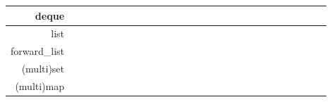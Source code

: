 \begin{frame}[fragile]
{\begin{tabular}{|r|lllll|llll|llllll|lllllllll|ll|}
        deque & \cellcolor{green} & \cellcolor{green} & \cellcolor{green} & \cellcolor{green} & \cellcolor{red} & \cellcolor{green} & \cellcolor{green} & \cellcolor{green} & \cellcolor{green} & \cellcolor{green} & \cellcolor{green} & \cellcolor{green} & \cellcolor{red} & \cellcolor{red} & \cellcolor{green} & \cellcolor{green} & \cellcolor{green} & \cellcolor{green} & \cellcolor{green} & \cellcolor{green} & \cellcolor{green} & \cellcolor{green} & \cellcolor{red} & \cellcolor{green} & \cellcolor{green} & \cellcolor{green} \\
        \hline
        list & \cellcolor{red} & \cellcolor{red} & \cellcolor{green} & \cellcolor{green} & \cellcolor{red} & \cellcolor{green} & \cellcolor{green} & \cellcolor{green} & \cellcolor{green} & \cellcolor{green} & \cellcolor{green} & \cellcolor{green} & \cellcolor{red} & \cellcolor{red} & \cellcolor{red} & \cellcolor{green} & \cellcolor{green} & \cellcolor{green} & \cellcolor{green} & \cellcolor{green} & \cellcolor{green} & \cellcolor{green} & \cellcolor{red} & \cellcolor{green} & \cellcolor{green} & \cellcolor{green} \\
        forward\_list & \cellcolor{red} & \cellcolor{red} & \cellcolor{green} & \cellcolor{red} & \cellcolor{red} & \cellcolor{green} & \cellcolor{green} & \cellcolor{red} & \cellcolor{red} & \cellcolor{green} & \cellcolor{red} & \cellcolor{green} & \cellcolor{red} & \cellcolor{red} & \cellcolor{red} & \cellcolor{green} & \cellcolor{yellow} & \cellcolor{yellow} & \cellcolor{yellow} & \cellcolor{red} & \cellcolor{green} & \cellcolor{green} & \cellcolor{red} & \cellcolor{green} & \cellcolor{green} & \cellcolor{green} \\
        \hline
        (multi)set & \cellcolor{red} & \cellcolor{red} & \cellcolor{red} & \cellcolor{red} & \cellcolor{red} & \cellcolor{green} & \cellcolor{green} & \cellcolor{green} & \cellcolor{green} & \cellcolor{green} & \cellcolor{green} & \cellcolor{green} & \cellcolor{red} & \cellcolor{red} & \cellcolor{red} & \cellcolor{green} & \cellcolor{green} & \cellcolor{green} & \cellcolor{green} & \cellcolor{red} & \cellcolor{red} & \cellcolor{red} & \cellcolor{red} & \cellcolor{green} & \cellcolor{green} & \cellcolor{green} \\
        (multi)map & \cellcolor{green} & \cellcolor{green} & \cellcolor{red} & \cellcolor{red} & \cellcolor{red} & \cellcolor{green} & \cellcolor{green} & \cellcolor{green} & \cellcolor{green} & \cellcolor{green} & \cellcolor{green} & \cellcolor{green} & \cellcolor{red} & \cellcolor{red} & \cellcolor{red} & \cellcolor{green} & \cellcolor{green} & \cellcolor{green} & \cellcolor{green} & \cellcolor{red} & \cellcolor{red} & \cellcolor{red} & \cellcolor{red} & \cellcolor{green} & \cellcolor{green} & \cellcolor{green} \\

\end{tabular}}
\end{frame}
